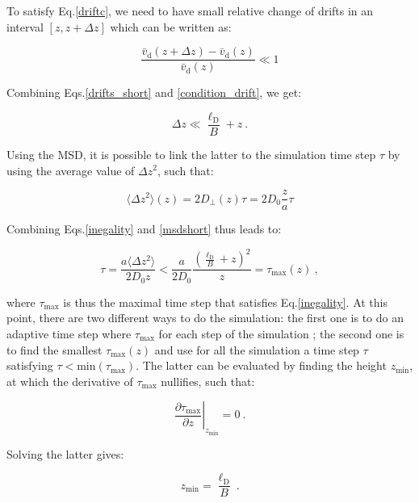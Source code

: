 To satisfy Eq.\ref{driftc}, we need to have small relative change of drifts in an interval $[z, z+\Delta z]$ which can be written as:

\begin{equation}
	\frac{\bar{v}_\mathrm{d} (z + \Delta z) - \bar{v}_\mathrm{d} (z)}{\bar{v}_\mathrm{d} (z)} \ll 1
	\label{condition_drift}
\end{equation}

Combining Eqs.\ref{drifts_short} and \ref{condition_drift}, we get:

\begin{equation}
	\Delta z \ll \frac{\ell_\mathrm{D}}{B} + z ~.
	\label{inegality}
\end{equation}


Using the \gls{MSD}, it is possible to link the latter to the simulation time step $\tau$ by using the average value of $\Delta z ^2 $, such that:

\begin{equation}
	\langle \Delta z ^2 \rangle (z) = 2 D_\bot (z) \tau = 2D_0 \frac{z}{a}\tau 
	\label{msdshort}
\end{equation}

Combining Eqs.\ref{inegality} and \ref{msdshort} thus leads to:

\begin{equation}
	\tau = \frac{a\langle \Delta z ^2 \rangle }{2 D_0 z} < \frac{a}{2 D_0 } \frac{(\frac{\ell_\mathrm{D}}{B} + z) ^2}{z} = \tau_\mathrm{max} (z)~,
	\label{taumax}
\end{equation}

where $ \tau_\mathrm{max}$ is thus the maximal time step that satisfies Eq.\ref{inegality}. At this point, there are two different ways to do the simulation: the first one is to do an adaptive time step where $\tau_\mathrm{max}$ for each step of the simulation ; the second one is to find the smallest $\tau_\mathrm{max}(z)$ and use for all the simulation a time step $\tau$ satisfying $\tau < \mathrm{min}(\tau_\mathrm{max}) $. The latter can be evaluated by finding the height $z_\mathrm{min}$, at which the derivative of $ \tau_\mathrm{max}$ nullifies, such that:

\begin{equation}
	\left. \frac{\partial \tau_\mathrm{max}}{\partial z} \right| _{z_\mathrm{min} }= 0 ~.
\end{equation} 

Solving the latter gives:

\begin{equation}
	z_\mathrm{min} = \frac{\ell_\mathrm{D}}{B} ~.
\end{equation}


